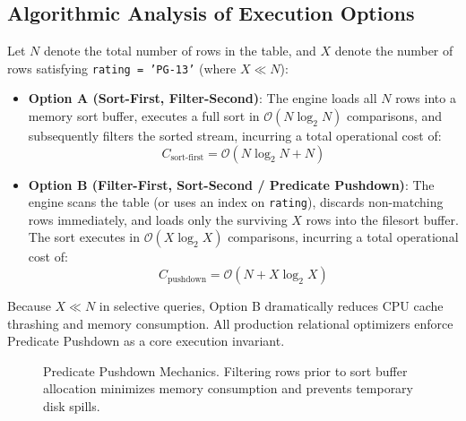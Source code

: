 \documentclass[10pt,twocolumn,letterpaper]{article}
\begin{document}
\subsection{Algorithmic Analysis of Execution Options}
Let $N$ denote the total number of rows in the table, and $X$ denote the number of rows satisfying \texttt{rating = 'PG-13'} (where $X \ll N$):
\begin{itemize}
    \item \textbf{Option A (Sort-First, Filter-Second)}: The engine loads all $N$ rows into a memory sort buffer, executes a full sort in $\mathcal{O}(N \log_2 N)$ comparisons, and subsequently filters the sorted stream, incurring a total operational cost of:
    \begin{equation}
    C_{\text{sort-first}} = \mathcal{O}(N \log_2 N + N)
    \end{equation}
    \item \textbf{Option B (Filter-First, Sort-Second / Predicate Pushdown)}: The engine scans the table (or uses an index on \texttt{rating}), discards non-matching rows immediately, and loads only the surviving $X$ rows into the filesort buffer. The sort executes in $\mathcal{O}(X \log_2 X)$ comparisons, incurring a total operational cost of:
    \begin{equation}
    C_{\text{pushdown}} = \mathcal{O}(N + X \log_2 X)
    \end{equation}
\end{itemize}

Because $X \ll N$ in selective queries, Option B dramatically reduces CPU cache thrashing and memory consumption. All production relational optimizers enforce Predicate Pushdown as a core execution invariant.

\begin{figure}[htbp]
\centering
{}
\caption{Predicate Pushdown Mechanics. Filtering rows prior to sort buffer allocation minimizes memory consumption and prevents temporary disk spills.}
\label{fig:pushdown}
\end{figure}
\end{document}
